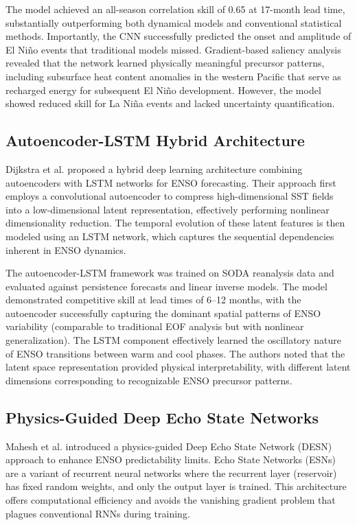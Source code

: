 The model achieved an all-season correlation skill of 0.65 at 17-month lead time, substantially outperforming both dynamical models and conventional statistical methods. Importantly, the CNN successfully predicted the onset and amplitude of El Ni\~{n}o events that traditional models missed. Gradient-based saliency analysis revealed that the network learned physically meaningful precursor patterns, including subsurface heat content anomalies in the western Pacific that serve as recharged energy for subsequent El Ni\~{n}o development. However, the model showed reduced skill for La Ni\~{n}a events and lacked uncertainty quantification.

\subsection{Autoencoder-LSTM Hybrid Architecture}

Dijkstra et al. \cite{dijkstra2019deep} proposed a hybrid deep learning architecture combining autoencoders with LSTM networks for ENSO forecasting. Their approach first employs a convolutional autoencoder to compress high-dimensional SST fields into a low-dimensional latent representation, effectively performing nonlinear dimensionality reduction. The temporal evolution of these latent features is then modeled using an LSTM network, which captures the sequential dependencies inherent in ENSO dynamics.

The autoencoder-LSTM framework was trained on SODA reanalysis data and evaluated against persistence forecasts and linear inverse models. The model demonstrated competitive skill at lead times of 6--12 months, with the autoencoder successfully capturing the dominant spatial patterns of ENSO variability (comparable to traditional EOF analysis but with nonlinear generalization). The LSTM component effectively learned the oscillatory nature of ENSO transitions between warm and cool phases. The authors noted that the latent space representation provided physical interpretability, with different latent dimensions corresponding to recognizable ENSO precursor patterns.

\subsection{Physics-Guided Deep Echo State Networks}

Mahesh et al. \cite{mahesh2024physics} introduced a physics-guided Deep Echo State Network (DESN) approach to enhance ENSO predictability limits. Echo State Networks (ESNs) are a variant of recurrent neural networks where the recurrent layer (reservoir) has fixed random weights, and only the output layer is trained. This architecture offers computational efficiency and avoids the vanishing gradient problem that plagues conventional RNNs during training.

